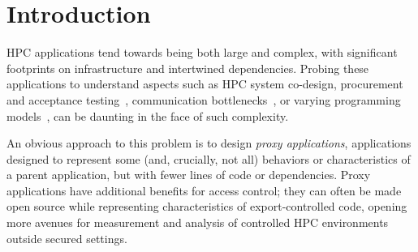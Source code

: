 \documentclass[conference]{IEEEtran}
\begin{document}
\section{Introduction}
HPC applications tend towards being both large and complex, with significant footprints on infrastructure and intertwined dependencies.
Probing these applications to understand aspects such as HPC system co-design, procurement and acceptance testing~\cite{larrea2020towards}, communication bottlenecks~\cite{aaziz2019fine}, or varying programming models~\cite{hochstein2005parallel}, can be daunting in the face of such complexity.

An obvious approach to this problem is to design \emph{proxy applications}, applications designed to represent some (and, crucially, not all) behaviors or characteristics of a parent application, but with fewer lines of code or dependencies.  Proxy applications have additional benefits for access control; they can often be made open source while representing characteristics of export-controlled code, opening more avenues for measurement and analysis of controlled HPC environments outside secured settings.
%

\end{document}
